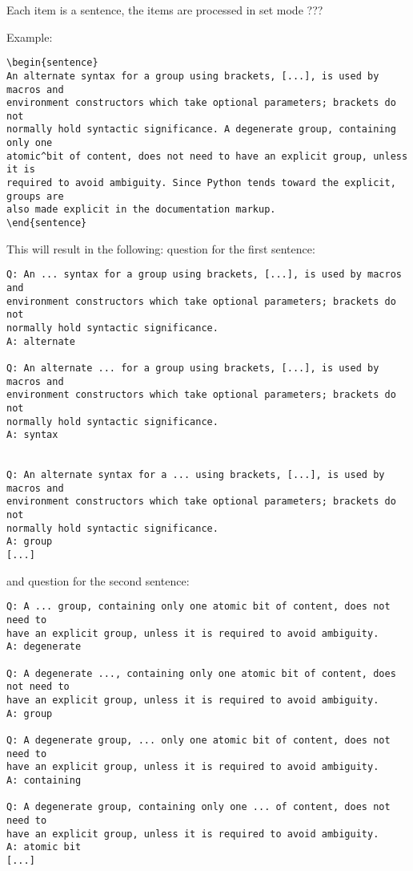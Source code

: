 \documentclass[a4paper,11pt]{article}
\begin{document}
Each item is a sentence, the items are processed in set mode ???


Example:
\begin{verbatim}
\begin{sentence}
An alternate syntax for a group using brackets, [...], is used by macros and
environment constructors which take optional parameters; brackets do not
normally hold syntactic significance. A degenerate group, containing only one
atomic^bit of content, does not need to have an explicit group, unless it is
required to avoid ambiguity. Since Python tends toward the explicit, groups are
also made explicit in the documentation markup.
\end{sentence}
\end{verbatim}

This will result in the following:
question for the first sentence:
\begin{verbatim}
Q: An ... syntax for a group using brackets, [...], is used by macros and
environment constructors which take optional parameters; brackets do not
normally hold syntactic significance.
A: alternate

Q: An alternate ... for a group using brackets, [...], is used by macros and
environment constructors which take optional parameters; brackets do not
normally hold syntactic significance.
A: syntax


Q: An alternate syntax for a ... using brackets, [...], is used by macros and
environment constructors which take optional parameters; brackets do not
normally hold syntactic significance.
A: group
[...]
\end{verbatim}


and question for the second sentence:
\begin{verbatim}
Q: A ... group, containing only one atomic bit of content, does not need to
have an explicit group, unless it is required to avoid ambiguity.
A: degenerate

Q: A degenerate ..., containing only one atomic bit of content, does not need to
have an explicit group, unless it is required to avoid ambiguity.
A: group

Q: A degenerate group, ... only one atomic bit of content, does not need to
have an explicit group, unless it is required to avoid ambiguity.
A: containing

Q: A degenerate group, containing only one ... of content, does not need to
have an explicit group, unless it is required to avoid ambiguity.
A: atomic bit
[...]
\end{verbatim}
\end{document}
